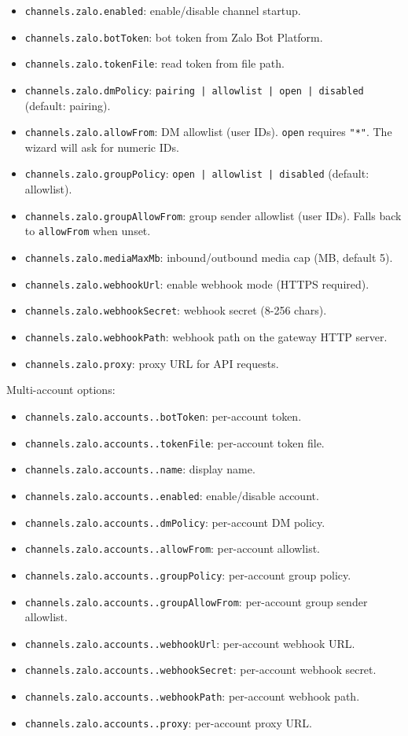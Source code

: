 \begin{itemize}
  \item \texttt{channels.zalo.enabled}: enable/disable channel startup.
  \item \texttt{channels.zalo.botToken}: bot token from Zalo Bot Platform.
  \item \texttt{channels.zalo.tokenFile}: read token from file path.
  \item \texttt{channels.zalo.dmPolicy}: \texttt{pairing | allowlist | open | disabled} (default: pairing).
  \item \texttt{channels.zalo.allowFrom}: DM allowlist (user IDs). \texttt{open} requires \texttt{"*"}. The wizard will ask for numeric IDs.
  \item \texttt{channels.zalo.groupPolicy}: \texttt{open | allowlist | disabled} (default: allowlist).
  \item \texttt{channels.zalo.groupAllowFrom}: group sender allowlist (user IDs). Falls back to \texttt{allowFrom} when unset.
  \item \texttt{channels.zalo.mediaMaxMb}: inbound/outbound media cap (MB, default 5).
  \item \texttt{channels.zalo.webhookUrl}: enable webhook mode (HTTPS required).
  \item \texttt{channels.zalo.webhookSecret}: webhook secret (8-256 chars).
  \item \texttt{channels.zalo.webhookPath}: webhook path on the gateway HTTP server.
  \item \texttt{channels.zalo.proxy}: proxy URL for API requests.
\end{itemize}


Multi-account options:

\begin{itemize}
  \item \texttt{channels.zalo.accounts..botToken}: per-account token.
  \item \texttt{channels.zalo.accounts..tokenFile}: per-account token file.
  \item \texttt{channels.zalo.accounts..name}: display name.
  \item \texttt{channels.zalo.accounts..enabled}: enable/disable account.
  \item \texttt{channels.zalo.accounts..dmPolicy}: per-account DM policy.
  \item \texttt{channels.zalo.accounts..allowFrom}: per-account allowlist.
  \item \texttt{channels.zalo.accounts..groupPolicy}: per-account group policy.
  \item \texttt{channels.zalo.accounts..groupAllowFrom}: per-account group sender allowlist.
  \item \texttt{channels.zalo.accounts..webhookUrl}: per-account webhook URL.
  \item \texttt{channels.zalo.accounts..webhookSecret}: per-account webhook secret.
  \item \texttt{channels.zalo.accounts..webhookPath}: per-account webhook path.
  \item \texttt{channels.zalo.accounts..proxy}: per-account proxy URL.
\end{itemize}



